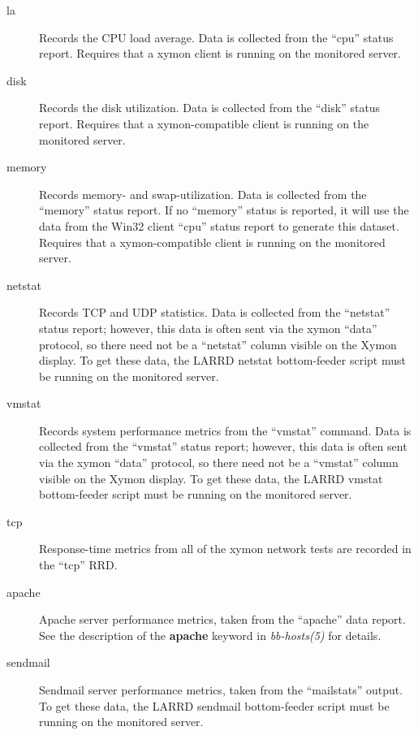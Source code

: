  \begin{description}
\item[la] Records the CPU load average. Data is collected from the ``cpu'' status report. Requires that a xymon client is running on the monitored server. 

 

\item[disk] Records the disk utilization. Data is collected from the ``disk'' status report. Requires that a xymon-compatible client is running on the monitored server. 

 

\item[memory] Records memory- and swap-utilization. Data is collected from the ``memory'' status report. If no ``memory'' status is reported, it will use the data from the Win32 client ``cpu'' status report to generate this dataset. Requires that a xymon-compatible client is running on the monitored server. 

 

\item[netstat] Records TCP and UDP statistics. Data is collected from the ``netstat'' status report; however, this data is often sent via the xymon ``data'' protocol, so there need not be a ``netstat'' column visible on the Xymon display. To get these data, the LARRD netstat bottom-feeder script must be running on the monitored server. 

 

\item[vmstat] Records system performance metrics from the ``vmstat'' command. Data is collected from the ``vmstat'' status report; however, this data is often sent via the xymon ``data'' protocol, so there need not be a ``vmstat'' column visible on the Xymon display. To get these data, the LARRD vmstat bottom-feeder script must be running on the monitored server. 

 

\item[tcp] Response-time metrics from all of the xymon network tests are recorded in the ``tcp'' RRD. 

 

\item[apache] Apache server performance metrics, taken from the ``apache'' data report. See the description of the \textbf{apache}
 keyword in \emph{bb-hosts(5)}
 for details. 

 

\item[sendmail] Sendmail server performance metrics, taken from the ``mailstats'' output. To get these data, the LARRD sendmail bottom-feeder script must be running on the monitored server. 


\end{description}
